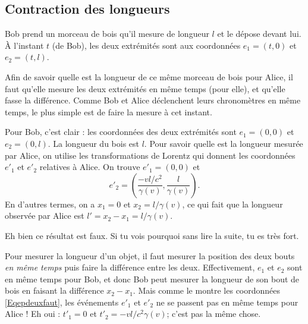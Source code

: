 \subsection{Contraction des longueurs}

Bob prend un morceau de bois qu'il mesure de longueur \( l\) et le dépose devant lui. À l'instant \( t\) (de Bob), les deux extrémités sont aux coordonnées \( e_1=(t,0)\) et \( e_2=(t,l)\).

Afin de savoir quelle est la longueur de ce même morceau de bois pour Alice, il faut qu'elle mesure les deux extrémités en même temps (pour elle), et qu'elle fasse la différence. Comme Bob et Alice déclenchent leurs chronomètres en même temps, le plus simple est de faire la mesure à cet instant.

Pour Bob, c'est clair : les coordonnées des deux extrémités sont \( e_1=(0,0)\) et \( e_2=(0,l)\). La longueur du bois est \( l\). Pour savoir quelle est la longueur mesurée par Alice, on utilise les transformations de Lorentz qui donnent les coordonnées \( e'_1\) et \( e'_2\) relatives à Alice. On trouve \( e'_1=(0,0)\) et
\begin{equation}		\label{Eqepdeuxfaut}
	e'_2=\left(   \frac{ -vl/c^2 }{ \gamma(v) },\frac{ l }{ \gamma(v) }   \right).
\end{equation}
En d'autres termes, on a \( x_1=0\) et \( x_2=l/\gamma(v)\), ce qui fait que la longueur observée par Alice est \( l'=x_2-x_1=l/\gamma(v)\).

Eh bien ce résultat est faux. Si tu vois pourquoi sans lire la suite, tu es très fort.

Pour mesurer la longueur d'un objet, il faut mesurer la position des deux bouts \emph{en même temps} puis faire la différence entre les deux. Effectivement, \( e_1\) et \( e_2\) sont en même temps pour Bob, et donc Bob peut mesurer la longueur de son bout de bois en faisant la différence \( x_2-x_1\). Mais comme le montre les coordonnées \eqref{Eqepdeuxfaut}, les événements \( e'_1\) et \( e'_2\) ne se passent pas en même temps pour Alice ! Eh oui : \( t'_1=0\) et \( t'_2=-vl/c^2\gamma(v)\); c'est pas la même chose.

